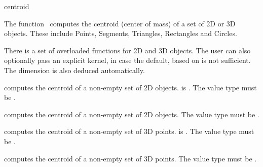
\begin{ccRefFunction}{centroid}  

\ccDefinition
  
The function \ccRefName\ computes the centroid (center of mass) of a set
of 2D or 3D objects. These include Points, Segments, Triangles, Rectangles and Circles.


There is a set of overloaded  functions for 2D and 3D objects.
The user can also optionally pass an explicit kernel, in case the default,
based on  is not sufficient.
The dimension is also deduced automatically.

{ computes the centroid of a non-empty set of 2D objects.
   is .  The value type must be .
 }

{ computes the centroid of a non-empty set of 2D objects.
  The value type must be .
 }

{ computes the centroid of a non-empty set of 3D points.
   is .
  The value type must be .
 }

{ computes the centroid of a non-empty set of 3D points.
  The value type must be .
 }


\ccSeeAlso
{}

\end{ccRefFunction}
